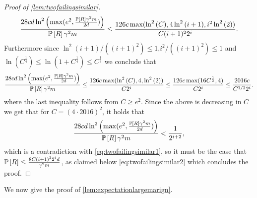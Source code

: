 \begin{proof}[Proof of \cref{lem:twofailingsimilar}]
    \begin{align*}
        \frac{28 cd\ln^{2}{\left( \max(e^{2},\frac{\operatorname*{\mathbb{P}}\left[R\right]\gamma^{2}m}{2d})\right)}}{\operatorname*{\mathbb{P}}\left[R\right]\gamma^{2}m}\leq \frac{126 c \max(\ln^{2}{\left(C \right)},4\ln^{2}{\left(i+1 \right)},i^{2}\ln^{2}{\left(2 \right)})}{ C(i+1)^{2}2^{i}}.
    \end{align*} 
    Furthermore since $ \ln^{2}{\left(i+1 \right)}/((i+1)^{2})\leq 1 $,$ i^{2}/((i+1)^{2})\leq 1 $ and $ \ln{\left(C^{\frac{1}{4}} \right)}\leq\ln{\left(1+C^{\frac{1}{4}} \right)} \leq C^{\frac{1}{4}}$  we conclude that 
    \begin{align*}
        \frac{28 cd\ln^{2}{\left( \max(e^{2},\frac{\operatorname*{\mathbb{P}}\left[R\right]\gamma^{2}m}{2d})\right)}}{\operatorname*{\mathbb{P}}\left[R\right]\gamma^{2}m}\leq \frac{126 c \max(\ln^{2}{\left(C \right)},4,\ln^{2}{\left(2 \right)})}{ C2^{i}}\leq \frac{126 c \max(16C^{\frac{1}{2}},4)}{ C2^{i}}\leq \frac{2016c}{C^{1/2}2^{i}}.
    \end{align*}
    where the last inequality follows from $ C\geq e^{2}.$ 
    Since the above is decreasing in $ C $ we get that for $ C=(4\cdot 2016)^2 $, it holds that
    \begin{align*}
        \frac{28 cd\ln^{2}{\left( \max(e^{2},\frac{\operatorname*{\mathbb{P}}\left[R\right]\gamma^{2}m}{2d})\right)}}{\operatorname*{\mathbb{P}}\left[R\right]\gamma^{2}m} <\frac{1}{2^{i+2}},
    \end{align*}  
    which is a contradiction with \cref{eq:twofailingsimilar1}, so it must be the case that $  \operatorname*{\mathbb{P}}\left[R\right]\leq \frac{8C(i+1)^{2}2^{i}d}{\gamma^{2}m}$, as claimed below \cref{eq:twofailingsimilar2} which concludes the proof.   
\end{proof}

We now give the proof of \cref{lem:expectationlargemarign}.


